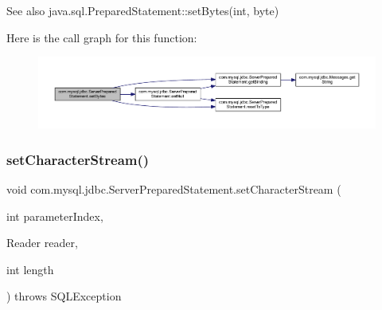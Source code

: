 \begin{DoxySeeAlso}{See also}
java.\+sql.\+Prepared\+Statement\+::set\+Bytes(int, byte) 
\end{DoxySeeAlso}
Here is the call graph for this function\+:
\nopagebreak
\begin{figure}[H]
\begin{center}
\leavevmode
\includegraphics[width=350pt]{classcom_1_1mysql_1_1jdbc_1_1_server_prepared_statement_a5cedc06238d893f25f948137c182c1ba_cgraph}
\end{center}
\end{figure}
\mbox{\label{classcom_1_1mysql_1_1jdbc_1_1_server_prepared_statement_af6753dd61ca0bdea3e4af6cf607a171d}} 
\subsubsection{\texorpdfstring{set\+Character\+Stream()}{setCharacterStream()}}
{\footnotesize\ttfamily void com.\+mysql.\+jdbc.\+Server\+Prepared\+Statement.\+set\+Character\+Stream (\begin{DoxyParamCaption}\item[{int}]{parameter\+Index,  }\item[{Reader}]{reader,  }\item[{int}]{length }\end{DoxyParamCaption}) throws S\+Q\+L\+Exception}

